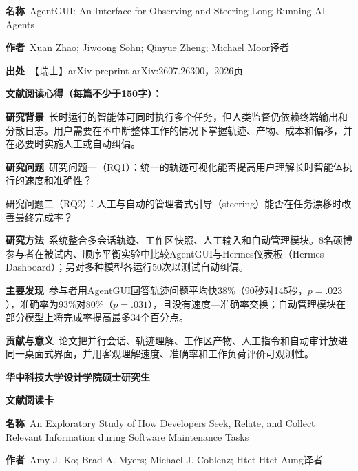 \noindent\textbf{名称}\ AgentGUI: An Interface for Observing and Steering Long-Running AI Agents\par
\noindent\textbf{作者}\ Xuan Zhao; Jiwoong Sohn; Qinyue Zheng; Michael Moor\quad 译者\par
\noindent\textbf{出处}\ 【瑞士】arXiv preprint arXiv:2607.26300，2026\quad 页\par
\vspace{0.35em}
\noindent\textbf{文献阅读心得（每篇不少于150字）：}\par
\noindent\textbf{研究背景}\ 长时运行的智能体可同时执行多个任务，但人类监督仍依赖终端输出和分散日志。用户需要在不中断整体工作的情况下掌握轨迹、产物、成本和偏移，并在必要时实施人工或自动纠偏。\par
\noindent\textbf{研究问题}\ 研究问题一（RQ1）：统一的轨迹可视化能否提高用户理解长时智能体执行的速度和准确性？\par
研究问题二（RQ2）：人工与自动的管理者式引导（steering）能否在任务漂移时改善最终完成率？\par
\noindent\textbf{研究方法}\ 系统整合多会话轨迹、工作区快照、人工输入和自动管理模块。8名硕博参与者在被试内、顺序平衡实验中比较AgentGUI与Hermes仪表板（Hermes Dashboard）；另对多种模型各运行50次以测试自动纠偏。\par
\noindent\textbf{主要发现}\ 参与者用AgentGUI回答轨迹问题平均快38\%（90秒对145秒，$p=.023$），准确率为93\%对80\%（$p=.031$），且没有速度—准确率交换；自动管理模块在部分模型上将完成率提高最多34个百分点。\par
\noindent\textbf{贡献与意义}\ 论文把并行会话、轨迹理解、工作区产物、人工指令和自动审计放进同一桌面式界面，并用客观理解速度、准确率和工作负荷评价可观测性。\par
\clearpage
\begin{center}
{\songti\bfseries\fontsize{18.5pt}{27.75pt}\selectfont 华中科技大学设计学院硕士研究生\par}
{\songti\bfseries\fontsize{18.5pt}{27.75pt}\selectfont 文献阅读卡\par}
\end{center}
\vspace{0.25em}
\noindent\underline{}\par
\vspace{0.35em}
\noindent\textbf{名称}\ An Exploratory Study of How Developers Seek, Relate, and Collect Relevant Information during Software Maintenance Tasks\par
\noindent\textbf{作者}\ Amy J. Ko; Brad A. Myers; Michael J. Coblenz; Htet Htet Aung\quad 译者\par
